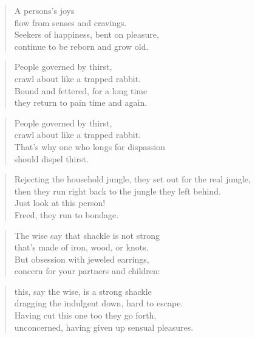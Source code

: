 \documentclass[12pt,openany]{book}%
\begin{document}
\begin{verse}%
A persons’s joys \\
flow from senses and cravings. \\
Seekers of happiness, bent on pleasure, \\
continue to be reborn and grow old. 

%
\end{verse}

\begin{verse}%
People governed by thirst, \\
crawl about like a trapped rabbit. \\
Bound and fettered, for a long time \\
they return to pain time and again. 

%
\end{verse}

\begin{verse}%
People governed by thirst, \\
crawl about like a trapped rabbit. \\
That’s why one who longs for dispassion \\
should dispel thirst. 

%
\end{verse}

\begin{verse}%
Rejecting the household jungle, they set out for the real jungle, \\
then they run right back to the jungle they left behind. \\
Just look at this person! \\
Freed, they run to bondage. 

%
\end{verse}

\begin{verse}%
The wise say that shackle is not strong \\
that’s made of iron, wood, or knots. \\
But obsession with jeweled earrings, \\
concern for your partners and children: 

%
\end{verse}

\begin{verse}%
this, say the wise, is a strong shackle \\
dragging the indulgent down, hard to escape. \\
Having cut this one too they go forth, \\
unconcerned, having given up sensual pleasures. 

%
\end{verse}
\end{document}
